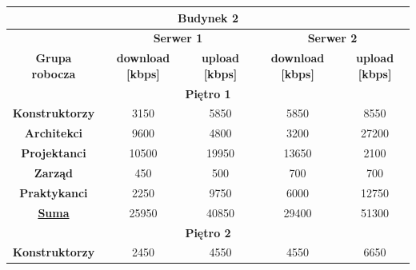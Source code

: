 \documentclass[a4paper, 12pt]{article}
\begin{document}
\begin{itemize}
\begin{table}[H]
	\centering
	\begin{tabular}{c|c|c|c|c|}
\hline
\multicolumn{5}{|c|}{\textbf{Budynek 2}}                                                                                                                             \\ \hline
\textbf{}                                    & \multicolumn{2}{c|}{\textbf{Serwer 1}}                    & \multicolumn{2}{c|}{\textbf{Serwer 2}}                    \\ \hline
\multicolumn{1}{|c|}{\textbf{Grupa robocza}} & \textbf{download {[}kbps{]}} & \textbf{upload {[}kbps{]}} & \textbf{download {[}kbps{]}} & \textbf{upload {[}kbps{]}} \\ \hline
\multicolumn{5}{|c|}{\textbf{Piętro 1}}                                                                                                                              \\ \hline
\multicolumn{1}{|c|}{\textbf{Konstruktorzy}} & 3150                         & 5850                       & 5850                         & 8550                       \\ \hline
\multicolumn{1}{|c|}{\textbf{Architekci}}    & 9600                         & 4800                       & 3200                         & 27200                      \\ \hline
\multicolumn{1}{|c|}{\textbf{Projektanci}}   & 10500                        & 19950                      & 13650                        & 2100                       \\ \hline
\multicolumn{1}{|c|}{\textbf{Zarząd}}        & 450                          & 500                        & 700                          & 700                        \\ \hline
\multicolumn{1}{|c|}{\textbf{Praktykanci}}   & 2250                         & 9750                       & 6000                         & 12750                      \\ \hline
\multicolumn{1}{|c|}{{\ul \textbf{Suma}}}    & 25950                        & 40850                      & 29400                        & 51300                      \\ \hline
\multicolumn{5}{|c|}{\textbf{Piętro 2}}                                                                                                                              \\ \hline
\multicolumn{1}{|c|}{\textbf{Konstruktorzy}} & 2450                         & 4550                       & 4550                         & 6650                       \\ \hline

\end{tabular}
\end{table}
\end{itemize}
\end{document}
